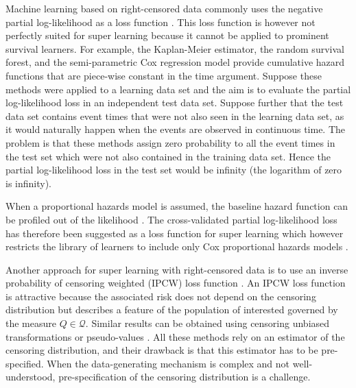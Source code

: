\documentclass[numsec,webpdf,contemporary,medium,namedate]{oup-authoring-template}%
\theoremstyle{thmstyleone}%
\theoremstyle{thmstyletwo}%
\theoremstyle{thmstylethree}%
\newcommand{\1}{\mathds{1}}
\begin{document}
Machine learning based on right-censored data commonly uses the
negative partial log-likelihood as a loss function
\citep[e.g.,][]{li2016regularized,yao2017deep,lee2018deephit,katzman2018deepsurv,gensheimer2019scalable,lee2021boosted,kvamme2021continuous}.
This loss function is however not perfectly suited for super learning
because it cannot be applied to prominent survival learners. For
example, the Kaplan-Meier estimator, the random survival forest, and
the semi-parametric Cox regression model provide cumulative hazard
functions that are piece-wise constant in the time argument. Suppose
these methods were applied to a learning data set and the aim is to
evaluate the partial log-likelihood loss in an independent test data
set. Suppose further that the test data set contains event times that
were not also seen in the learning data set, as it would naturally
happen when the events are observed in continuous time. The problem is
that these methods assign zero probability to all the event times in
the test set which were not also contained in the training data set.
Hence the partial log-likelihood loss in the test set would be
infinity (the logarithm of zero is infinity).

When a proportional hazards model is assumed, the baseline hazard
function can be profiled out of the likelihood \citep{cox1972regression}.
The cross-validated partial log-likelihood loss  \citep{verweij1993cross} has therefore been
suggested as a loss function for super learning which however
restricts the library of learners to include only Cox proportional
hazards models \citep{golmakani2020super}.

Another approach for super learning with right-censored data is to use an
inverse probability of censoring weighted (IPCW) loss function
\citep{graf1999assessment,van2003unicv,molinaro2004tree,keles2004asymptotically,hothorn2006survival,gerds2006consistent,gonzalez2021stacked}.
An IPCW loss function is attractive because the associated risk does not depend
on the censoring distribution but describes a feature of the population of
interested governed by the measure \( Q \in \mathcal{Q} \). Similar results can
be obtained using censoring unbiased transformations
\citep{fan1996local,steingrimsson2019censoring} or pseudo-values
\citep{andersen2003generalised,mogensen2013random,sachs2019ensemble}. All these
methods rely on an estimator of the censoring distribution, and their drawback
is that this estimator has to be pre-specified. When the data-generating
mechanism is complex and not well-understood, pre-specification of the censoring
distribution is a challenge.
\end{document}
